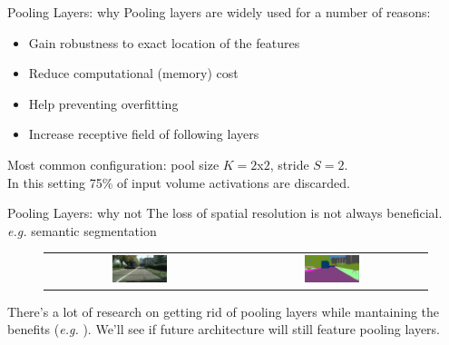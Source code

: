\documentclass[aspectratio=169]{beamer}
\begin{document}

\begin{frame}{Pooling Layers: why}
Pooling layers are widely used for a number of reasons:
\begin{itemize}
\item Gain robustness to exact location of the features
\item Reduce computational (memory) cost
\item Help preventing overfitting
\item Increase receptive field of following layers
\end{itemize}
Most common configuration: pool size $K=2$x$2$, stride $S=2$.\\
In this setting 75\% of input volume activations are discarded.
\end{frame}


\begin{frame}{Pooling Layers: why not}
The loss of spatial resolution is not always beneficial.\\
\emph{e.g.} semantic segmentation
\begin{figure}
\begin{tabular}{cc}
\includegraphics[width=0.3\textwidth]{img/cnn/semseg_in.jpg}&
\includegraphics[width=0.3\textwidth]{img/cnn/semseg_out.png}
\end{tabular}
\end{figure}
There's a lot of research on getting rid of pooling layers while mantaining the benefits (\emph{e.g.} \cite{springenberg2014striving,yu2015multi}). We'll see if future architecture will still feature pooling layers.
\end{frame}

\end{document}
